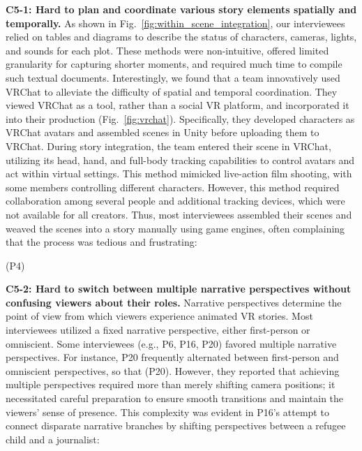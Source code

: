 \textbf{C5-1: Hard to plan and coordinate various story elements spatially and temporally.}  
As shown in Fig.~\ref{fig:within_scene_integration}, our interviewees relied on tables and diagrams  to describe the status of characters, cameras, lights, and sounds for each plot. These methods were non-intuitive, offered limited granularity for capturing shorter moments, and required much time to compile such textual documents. 
%
Interestingly, we found that a team innovatively used VRChat to alleviate the difficulty of spatial and temporal coordination. They viewed VRChat as a tool, rather than a social VR platform, and incorporated it into their production (Fig.~\ref{fig:vrchat}). 
Specifically, they developed characters as VRChat avatars and assembled scenes in Unity before uploading them to VRChat. During story integration, the team entered their scene in VRChat, utilizing its head, hand, and full-body tracking capabilities to control avatars and act within virtual settings. This method mimicked live-action film shooting, with some members controlling different characters.
However, this method required collaboration among several people and additional tracking devices, which were not available for all creators. 
%
Thus, most interviewees assembled their scenes and weaved the scenes into a story manually using game engines, often complaining that the process was tedious and frustrating:

 (P4)

\textbf{C5-2: Hard to switch between multiple narrative perspectives without confusing viewers about their roles.}
Narrative perspectives determine the point of view from which viewers experience animated VR stories. Most interviewees utilized a fixed narrative perspective, either first-person or omniscient. Some interviewees (e.g., P6, P16, P20) favored multiple narrative perspectives. For instance, P20 frequently alternated between first-person and omniscient perspectives, so that  (P20). However, they reported that achieving multiple perspectives required more than merely shifting camera positions; it necessitated careful preparation to ensure smooth transitions and maintain the viewers' sense of presence. This complexity was evident in P16’s attempt to connect disparate narrative branches by shifting perspectives between a refugee child and a journalist:

